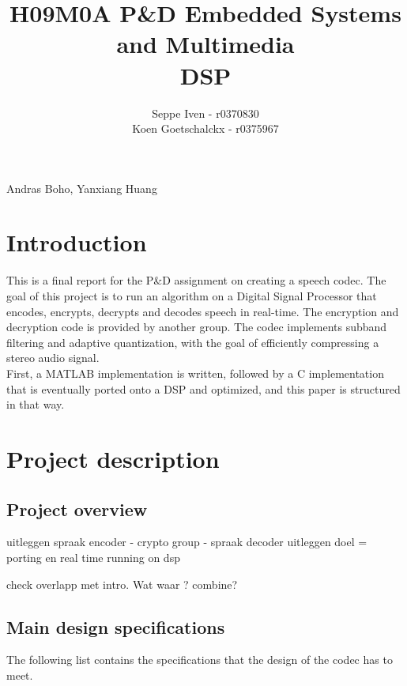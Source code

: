 \documentclass[a4paper]{article}
\title{H09M0A P\&D Embedded Systems and Multimedia \\ DSP}
\author{Seppe Iven - r0370830 \\ Koen Goetschalckx - r0375967}
\begin{document}
 
\maketitle
\begin{center}Andras Boho, Yanxiang Huang
\end{center}
\section{Introduction}
This is a final report for the P\&D assignment on creating a speech codec. The goal of this project is to run an algorithm on a Digital Signal Processor that encodes, encrypts, decrypts and decodes speech in real-time. The encryption and decryption code is provided by another group. The codec implements subband filtering and adaptive quantization, with the goal of efficiently compressing a stereo audio signal.\\
First, a MATLAB implementation is written, followed by a C implementation that is eventually ported onto a DSP and optimized, and this paper is structured in that way.
\section{Project description}
\subsection{Project overview}
uitleggen spraak encoder - crypto group - spraak decoder
uitleggen doel = porting en real time running on dsp

check overlapp met intro. Wat waar ?  combine?
\subsection{Main design specifications}
The following list contains the specifications that the design of the codec has to meet.
\end{document}

